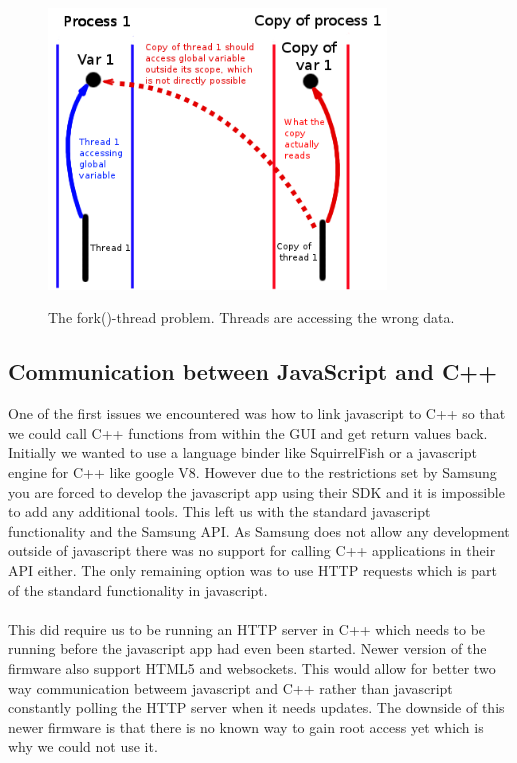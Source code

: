\begin{center}
\begin{figure}[h]
	\centering
	\mbox{\includegraphics[width=0.8\textwidth]{Images/fork-thread.png}}
	\label{fig:fork_thread}
	\caption{The fork()-thread problem. Threads are accessing the wrong data.}
\end{figure}
\end{center}

\subsection{Communication between JavaScript and C++}
One of the first issues we encountered was how to link javascript to C++ so that we could call C++ functions from within the GUI and get return values back. Initially we wanted to use a language binder like SquirrelFish or a javascript engine for C++ like google V8. However due to the restrictions set by Samsung you are forced to develop the javascript app using their SDK and it is impossible to add any additional tools. This left us with the standard javascript functionality and the Samsung API. As Samsung does not allow any development outside of javascript there was no support for calling C++ applications in their API either. The only remaining option was to use HTTP requests which is part of the standard functionality in javascript.
\\\\
This did require us to be running an HTTP server in C++ which needs to be running before the javascript app had even been started. Newer version of the firmware also support HTML5 and websockets. This would allow for better two way communication betweem javascript and C++ rather than javascript constantly polling the HTTP server when it needs updates. The downside of this newer firmware is that there is no known way to gain root access yet which is why we could not use it.

